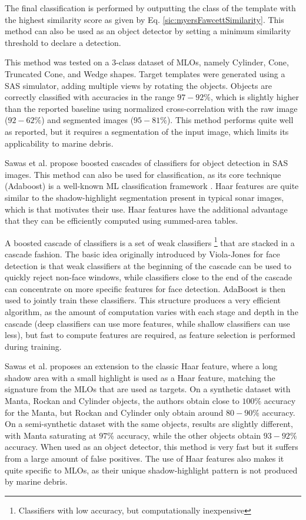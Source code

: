 The final classification is performed by outputting the class of the template with the highest similarity score as given by Eq. \ref{sic:myersFawcettSimilarity}. This method can also be used as an object detector by setting a minimum similarity threshold to declare a detection.

This method was tested on a 3-class dataset of MLOs, namely Cylinder, Cone, Truncated Cone, and Wedge shapes. Target templates were generated using a SAS simulator, adding multiple views by rotating the objects. Objects are correctly classified with accuracies in the range $97-92 \%$, which is slightly higher than the reported baseline using normalized cross-correlation with the raw image ($92-62 \%$) and segmented images ($95-81 \%$). This method performs quite well as reported, but it requires a segmentation of the input image, which limits its applicability to marine debris.

Sawas et al. \cite{sawas2010cascade} \cite[1em]{sawas2012cascade} propose boosted cascades of classifiers for object detection in SAS images. This method can also be used for classification, as its core technique (Adaboost) is a well-known ML classification framework . Haar features are quite similar to the shadow-highlight segmentation present in typical sonar images, which is that motivates their use. Haar features have the additional advantage that they can be efficiently computed using summed-area tables.

A boosted cascade of classifiers \cite[1em]{bishop2006pattern} is a set of weak classifiers \footnote[][1em]{Classifiers with low accuracy, but computationally inexpensive} that are stacked in a cascade fashion. The basic idea originally introduced by Viola-Jones \cite[2em]{viola2001rapid} for face detection is that weak classifiers at the beginning of the cascade can be used to quickly reject non-face windows, while classifiers close to the end of the cascade can concentrate on more specific features for face detection. AdaBoost is then used to jointly train these classifiers.
This structure produces a very efficient algorithm, as the amount of computation varies with each stage and depth in the cascade (deep classifiers can use more features, while shallow classifiers can use less), but fast to compute features are required, as feature selection is performed during training.

Sawas et al. proposes an extension to the classic Haar feature, where a long shadow area with a small highlight is used as a Haar feature, matching the signature from the MLOs that are used as targets. On a synthetic dataset with Manta, Rockan and Cylinder objects, the authors obtain close to $100 \%$ accuracy for the Manta, but Rockan and Cylinder only obtain around $80-90 \%$ accuracy.
On a semi-synthetic dataset with the same objects, results are slightly different, with Manta saturating at $97 \%$ accuracy, while the other objects obtain $93-92 \%$ accuracy. When used as an object detector, this method is very fast but it suffers from a large amount of false positives. The use of Haar features also makes it quite specific to MLOs, as their unique shadow-highlight pattern is not produced by marine debris.


